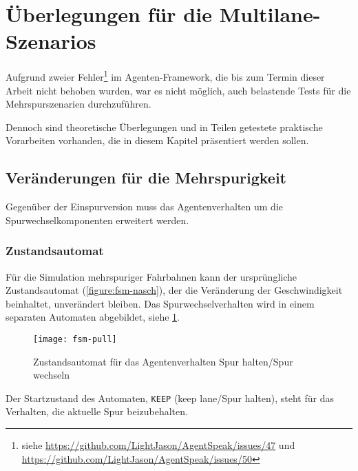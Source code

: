 \section{Überlegungen für die Multilane-Szenarios}
\label{sec:ueberlegungen-multilane}

Aufgrund zweier Fehler\footnote{siehe \url{https://github.com/LightJason/AgentSpeak/issues/47} und \url{https://github.com/LightJason/AgentSpeak/issues/50}} im Agenten-Framework, die bis zum Termin dieser Arbeit nicht behoben wurden, war es nicht möglich, auch belastende Tests für die Mehrspurszenarien durchzuführen.

Dennoch sind theoretische Überlegungen und in Teilen getestete praktische Vorarbeiten vorhanden, die in diesem Kapitel präsentiert werden sollen.






\subsection{Veränderungen für die Mehrspurigkeit}
\label{sec:multilane-change}

Gegenüber der Einspurversion muss das Agentenverhalten um die Spurwechselkomponenten erweitert werden.

\subsubsection{Zustandsautomat}

Für die Simulation mehrspuriger Fahrbahnen kann der ursprüngliche Zustandsautomat (\cref{figure:fsm-nasch}), der die Veränderung der Geschwindigkeit beinhaltet, unverändert bleiben.
Das Spurwechselverhalten wird in einem separaten Automaten abgebildet, siehe \cref{figure:fsm-pull}.

\begin{figure}[hptb]
 \centering
 \texttt{[image: fsm-pull]}
 \caption[Zustandsautomat für das Spurverhalten]
 		{Zustandsautomat für das Agentenverhalten Spur halten/Spur wechseln}
 \label{figure:fsm-pull}
\end{figure}

Der Startzustand des Automaten, \texttt{KEEP} (keep lane/Spur halten), steht für das Verhalten, die aktuelle Spur beizubehalten.


